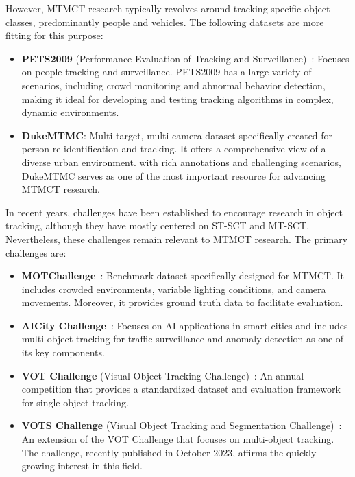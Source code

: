 However, MTMCT research typically revolves around tracking specific object classes, predominantly people and vehicles. The following datasets are more fitting for this purpose:

\begin{itemize}
    \item \textbf{PETS2009} (Performance Evaluation of Tracking and Surveillance)~\cite{Ferryman09}: Focuses on people tracking and surveillance. PETS2009 has a large variety of scenarios, including crowd monitoring and abnormal behavior detection, making it ideal for developing and testing tracking algorithms in complex, dynamic environments.
    \item \textbf{DukeMTMC}\cite{Ristani16}: Multi-target, multi-camera dataset specifically created for person re-identification and tracking. It offers a comprehensive view of a diverse urban environment. with rich annotations and challenging scenarios, DukeMTMC serves as one of the most important resource for advancing MTMCT research.
\end{itemize}

In recent years, challenges have been established to encourage research in object tracking, although they have mostly centered on ST-SCT and MT-SCT. Nevertheless, these challenges remain relevant to MTMCT research. The primary challenges are:

\begin{itemize}
    \item \textbf{MOTChallenge}~\cite{Dendorfer20}: Benchmark dataset specifically designed for MTMCT. It includes crowded environments, variable lighting conditions, and camera movements. Moreover, it provides ground truth data to facilitate evaluation.
    \item \textbf{AICity Challenge}~\cite{Naphade23}: Focuses on AI applications in smart cities and includes multi-object tracking for traffic surveillance and anomaly detection as one of its key components.
    \item \textbf{VOT Challenge} (Visual Object Tracking Challenge)~\cite{Kristan22}: An annual competition that provides a standardized dataset and evaluation framework for single-object tracking.
    \item \textbf{VOTS Challenge} (Visual Object Tracking and Segmentation Challenge)~\cite{Kristan23}: An extension of the VOT Challenge that focuses on multi-object tracking. The challenge, recently published in October 2023, affirms the quickly growing interest in this field.
\end{itemize}

